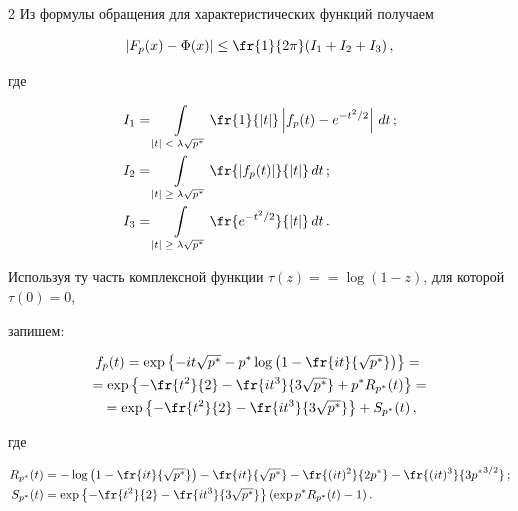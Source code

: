 \begin{multicols}{2}
Из формулы обращения для характеристических функций получаем

\begin{equation*}

|F_p(x) - \IP(x)| \le \fr{1}{2\pi} (I_1 + I_2 +I_3)\,,

\end{equation*}

где

\begin{align*}

I_1 &= \int\limits_{|t|\; < \;\lambda \sqrt{p^*}} \fr{1}{|t|}\left| f_p(t) - e^{-t^2/2}\right|\,dt\,;\\

I_2 &= \int\limits_{|t|\; \ge \;\lambda \sqrt{p^*}} \fr{|f_p(t)|}{|t|}\,dt\,;\\

I_3 &= \int\limits_{|t| \;\ge\; \lambda \sqrt{p^*}} \fr{e^{-t^2/2}}{|t|}\,dt\,.

\end{align*}

Используя ту часть комплексной функции $\tau (z) =$\linebreak $= \log (1- z )$,  для которой $\tau(0)=0$,

запишем:

\begin{multline*}

f_p(t) = \exp \left\{-it \sqrt{p^*} -p^* \log\left(1 - \fr{it}{\sqrt{p^*}}\right)\right \} ={}\\

{}=

\exp \left\{- \fr{t^2}{2} - \fr{it^3}{3\sqrt{p^*}} + p^* R_{p^*}(t) \right \}={}\\

{}       = \exp \left\{- \fr{t^2}{2} - \fr{it^3}{3\sqrt{p^*}} \right \}+ S_{p^*}(t)\,,

\end{multline*}

где

\begin{align*}

 R_{p^*}(t) &= - \log \left(1 - \fr{it}{\sqrt{p^*}}\right) -\fr{it}{\sqrt{p^*}}

 - \fr{(it)^2}{2p^*} -\fr{(it)^3}{3{p^*}^{3/2}}\,;\\

 S_{p^*}(t) &= \exp\left\{-\fr{t^2}{2} - \fr{it^3}{3\sqrt{p^*}}\right\}(\exp{p^* R_{p^*}(t)} -1)\,.

\end{align*}


\end{multicols}
